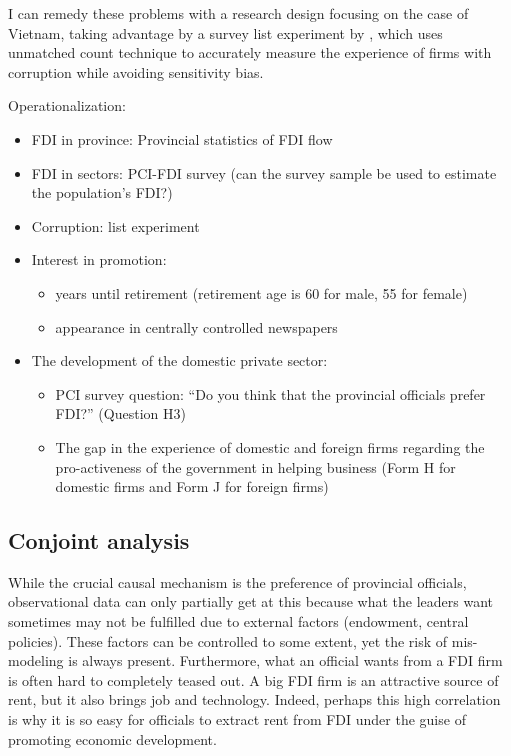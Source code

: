 \documentclass[12pt]{article}
\begin{document}
I can remedy these problems with a research design focusing on the case of Vietnam, taking advantage by a survey list experiment by \citet{Malesky2015}, which uses unmatched count technique to accurately measure the experience of firms with corruption while avoiding sensitivity bias.

Operationalization:
\begin{itemize}
\item FDI in province: Provincial statistics of FDI flow
\item FDI in sectors: PCI-FDI survey (can the survey sample be used to estimate the population's FDI?)
\item Corruption: list experiment \citep{Malesky2015}
\item Interest in promotion: 
\begin{itemize}
	\item years until retirement (retirement age is 60 for male, 55 for female)
	\item appearance in centrally controlled newspapers
\end{itemize}
\item The development of the domestic private sector:
\begin{itemize}
	\item PCI survey question: ``Do you think that the provincial officials prefer FDI?'' (Question H3)
	\item The gap in the experience of domestic and foreign firms regarding the pro-activeness of the government in helping business (Form H for domestic firms and Form J for foreign firms)
\end{itemize}
\end{itemize}

\subsection{Conjoint analysis}

While the crucial causal mechanism is the preference of provincial officials, observational data can only partially get at this because what the leaders want sometimes may not be fulfilled due to external factors (endowment, central policies). These factors can be controlled to some extent, yet the risk of mis-modeling is always present. Furthermore, what an official wants from a FDI firm is often hard to completely teased out. A big FDI firm is an attractive source of rent, but it also brings job and technology. Indeed, perhaps this high correlation is why it is so easy for officials to extract rent from FDI under the guise of promoting economic development.
\end{document}
